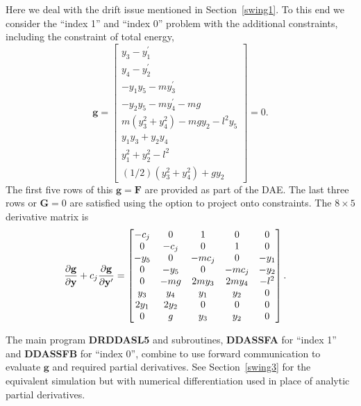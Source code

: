 \documentclass[twoside]{MATH77}
\begin{document}
Here we deal with the drift issue mentioned in Section~\ref{swing1}.  To this
end we consider the ``index 1'' and ``index 0''  problem with the additional
constraints, including the constraint of total energy,
\begin{equation*}
  \mathbf{g}=
  \begin{bmatrix}
    y_{3}-y_{1}^{\prime}\\
    y_{4}-y_{2}^{\prime}\\
    -y_{1}y_{5}-my_{3}^{\prime}\\
    -y_{2}y_{5}-my_{4}^{\prime}-mg\\
    m(y_{3}^{2}+y_{4}^{2})  -mgy_{2}-l^{2}y_{5}\\
    y_{1}y_{3}+y_{2}y_{4}\\
    y_{1}^{2}+y_{2}^{2}-l^{2}\\
    (1/2)(y_{3}^{2}+y_{4}^{2})+gy_{2}
  \end{bmatrix} = 0.
\end{equation*}
The first five rows of this $\mathbf{g}=\mathbf{F}$ are provided as part of the DAE.  The
last three rows  or $\mathbf{G}=0$ are satisfied using the option to project onto constraints.
The $8 \times 5$ derivative matrix is
\begin{equation*}\hspace{-10pt}
  \frac{\partial \mathbf{g}}{\partial \mathbf{y}}+c_{j}
  \frac{\partial \mathbf{g}}{\partial \mathbf{y}^{\prime}}=
  \begin{bmatrix}
    -c_{j} & 0 & 1 & 0 & 0\\
    0 & -c_{j} & 0 & 1 & 0\\
    -y_{5} & 0 & -mc_{j} & 0 & -y_{1}\\
    0 & -y_{5} & 0 & -mc_{j} & -y_{2}\\
    0 & -mg & 2my_{3} & 2my_{4} & -l^{2}\\
    y_{3} & y_{4} & y_{1} & y_{2} & 0\\
    2y_{1} & 2y_{2} & 0 & 0 & 0 \\
    0      &g       &y_{3} & y_{2} & 0
  \end{bmatrix}.
\end{equation*}

The main program \textbf{DRDDASL5} and subroutines, \textbf{DDASSFA} for ``index 1'' and
\textbf{DDASSFB} for ``index 0'', combine to use forward communication
to evaluate $\mathbf{g}$ and required partial derivatives.
See Section~\ref{swing3} for
the equivalent simulation but with numerical differentiation used
in place of analytic partial derivatives.
\end{document}
